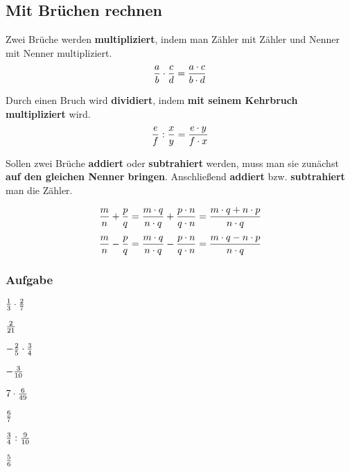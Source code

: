 \documentclass[
  ngerman,
]{book}
\begin{document}
\hypertarget{mit-bruxfcchen-rechnen}{%
\subsection*{Mit Brüchen rechnen}\label{mit-bruxfcchen-rechnen}}

Zwei Brüche werden \textbf{multipliziert}, indem man Zähler mit Zähler und Nenner mit Nenner multipliziert.
\[{a \over b} \cdot {c \over d} = {a \cdot c \over b \cdot d} \]

Durch einen Bruch wird \textbf{dividiert}, indem \textbf{mit seinem Kehrbruch multipliziert} wird.
\[{e \over f} : {x \over y} = {e \cdot y \over f \cdot x}\]

Sollen zwei Brüche \textbf{addiert} oder \textbf{subtrahiert} werden, muss man sie zunächst \textbf{auf den gleichen Nenner bringen}. Anschließend \textbf{addiert} bzw. \textbf{subtrahiert} man die Zähler.

\[{m \over n}+{p \over q} = \frac{m \cdot q}{n \cdot q} + \frac{p \cdot n}{q \cdot n} = {m \cdot q + n \cdot p \over n \cdot q}\]
\[{m \over n}-{p \over q} = \frac{m \cdot q}{n \cdot q} - \frac{p \cdot n}{q \cdot n} = {m \cdot q - n \cdot p \over n \cdot q}\]

\hypertarget{section-6}{%
\subsubsection*{}\label{section-6}}

\hypertarget{aufgabe-2}{%
\subsubsection*{Aufgabe}\label{aufgabe-2}}

\({1 \over 3}\cdot{2 \over 7}\)

\leavevmode\hypertarget{toggleText17}{}%
\(2 \over 21\)

\(-{2 \over 5}\cdot{3 \over 4}\)

\leavevmode\hypertarget{toggleText18}{}%
\(-{3 \over 10}\)

\(7\cdot{6 \over 49}\)

\leavevmode\hypertarget{toggleText19}{}%
\(6 \over 7\)

\({3 \over 4}:{9 \over 10}\)

\leavevmode\hypertarget{toggleText20}{}%
\(5 \over 6\)
\end{document}
